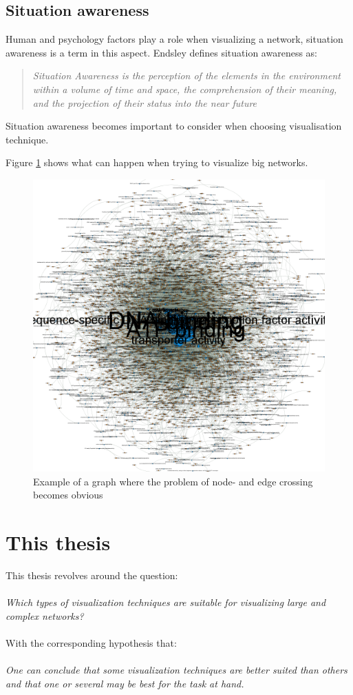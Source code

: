 \documentclass[a4paper,11pt]{kth-mag}
\begin{document}
\subsection{Situation awareness}
Human and psychology factors play a role when visualizing a network, situation awareness is a term in this aspect. Endsley\cite{195097} defines situation awareness as:
\begin{quote}
\emph{Situation Awareness is the perception of the elements in the environment within a volume of time and space, the comprehension of their meaning, and
the projection of their status into the near future}
\end{quote}
Situation awareness becomes important to consider when choosing visualisation technique.

Figure \ref{fig:hair_ball} shows  what can happen when trying to visualize big networks.

\newpage
\begin{figure}[!htbp]
	\centering
	\includegraphics[scale=0.4]{HairBallGraph}
	\caption{Example of a graph where the problem of node- and edge crossing becomes obvious}
	\label{fig:hair_ball}
\end{figure}
\newpage
\section{This thesis}
This thesis revolves around the question:\\
\\
\emph{Which types of visualization techniques are suitable for visualizing large and complex networks?}\\
\\
With the corresponding hypothesis that:\\
\\
\emph{One can conclude that some visualization techniques are better suited than others and that one or several may be best for the task at hand.}
\\
\end{document}
